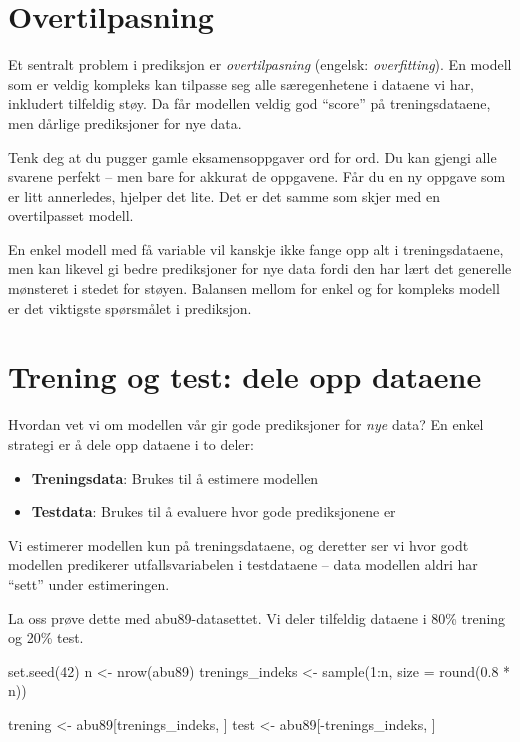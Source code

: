 \documentclass[
  norsk,
  letterpaper,
  DIV=11,
  numbers=noendperiod]{scrreprt}
\newenvironment{Shaded}{\begin{snugshade}}{\end{snugshade}}
\newcommand{\AttributeTok}[1]{\textcolor[rgb]{0.40,0.45,0.13}{#1}}
\newcommand{\DecValTok}[1]{\textcolor[rgb]{0.68,0.00,0.00}{#1}}
\newcommand{\FloatTok}[1]{\textcolor[rgb]{0.68,0.00,0.00}{#1}}
\newcommand{\FunctionTok}[1]{\textcolor[rgb]{0.28,0.35,0.67}{#1}}
\newcommand{\NormalTok}[1]{\textcolor[rgb]{0.00,0.23,0.31}{#1}}
\newcommand{\OtherTok}[1]{\textcolor[rgb]{0.00,0.23,0.31}{#1}}
\newcommand{\SpecialCharTok}[1]{\textcolor[rgb]{0.37,0.37,0.37}{#1}}
\providecommand{\tightlist}{%
  \setlength{\itemsep}{0pt}\setlength{\parskip}{0pt}}
\theoremstyle{definition}
\theoremstyle{remark}
\begin{document}
\section{Overtilpasning}\label{overtilpasning}

Et sentralt problem i prediksjon er \emph{overtilpasning} (engelsk:
\emph{overfitting}). En modell som er veldig kompleks kan tilpasse seg
alle særegenhetene i dataene vi har, inkludert tilfeldig støy. Da får
modellen veldig god ``score'' på treningsdataene, men dårlige
prediksjoner for nye data.

Tenk deg at du pugger gamle eksamensoppgaver ord for ord. Du kan gjengi
alle svarene perfekt -- men bare for akkurat de oppgavene. Får du en ny
oppgave som er litt annerledes, hjelper det lite. Det er det samme som
skjer med en overtilpasset modell.

En enkel modell med få variable vil kanskje ikke fange opp alt i
treningsdataene, men kan likevel gi bedre prediksjoner for nye data
fordi den har lært det generelle mønsteret i stedet for støyen. Balansen
mellom for enkel og for kompleks modell er det viktigste spørsmålet i
prediksjon.

\section{Trening og test: dele opp
dataene}\label{trening-og-test-dele-opp-dataene}

Hvordan vet vi om modellen vår gir gode prediksjoner for \emph{nye}
data? En enkel strategi er å dele opp dataene i to deler:

\begin{itemize}
\tightlist
\item
  \textbf{Treningsdata}: Brukes til å estimere modellen
\item
  \textbf{Testdata}: Brukes til å evaluere hvor gode prediksjonene er
\end{itemize}

Vi estimerer modellen kun på treningsdataene, og deretter ser vi hvor
godt modellen predikerer utfallsvariabelen i testdataene -- data
modellen aldri har ``sett'' under estimeringen.

La oss prøve dette med abu89-datasettet. Vi deler tilfeldig dataene i
80\% trening og 20\% test.

\begin{Shaded}
\begin{Highlighting}[]
\FunctionTok{set.seed}\NormalTok{(}\DecValTok{42}\NormalTok{)}
\NormalTok{n }\OtherTok{\textless{}{-}} \FunctionTok{nrow}\NormalTok{(abu89)}
\NormalTok{trenings\_indeks }\OtherTok{\textless{}{-}} \FunctionTok{sample}\NormalTok{(}\DecValTok{1}\SpecialCharTok{:}\NormalTok{n, }\AttributeTok{size =} \FunctionTok{round}\NormalTok{(}\FloatTok{0.8} \SpecialCharTok{*}\NormalTok{ n))}

\NormalTok{trening }\OtherTok{\textless{}{-}}\NormalTok{ abu89[trenings\_indeks, ]}
\NormalTok{test     }\OtherTok{\textless{}{-}}\NormalTok{ abu89[}\SpecialCharTok{{-}}\NormalTok{trenings\_indeks, ]}
\end{Highlighting}
\end{Shaded}
\end{document}
